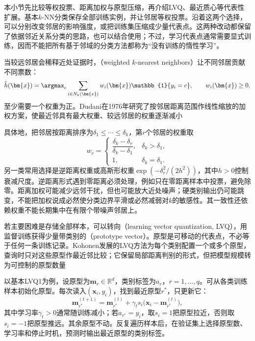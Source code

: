 本小节先比较等权投票、距离加权与原型压缩，再介绍LVQ、最近质心等代表性扩展。基本$k$-NN分类保存全部训练实例，并让邻居等权投票。沿着这两个选择，可以分别改变邻居的影响强度，或把训练集压缩成少量代表点。这两种改动都保留了依据邻近关系分类的思路，也可以结合使用；不过，学习代表点通常需要显式训练，因而不能把所有基于邻域的分类方法都称为“没有训练的惰性学习”。

当较远邻居会稀释近处证据时，（weighted $k$-nearest neighbors）让不同邻居贡献不同票数：
\begin{equation}
  \hat h(\bm{x})=\argmax_c
  \sum_{i\in N_k(\bm{x})}
  w_i(\bm{x})\mathbb{1}\{y_i=c\},
  \qquad w_i(\bm{x})\geq0.
  \label{eq:classification-weighted-knn}
\end{equation}
至少需要一个权重为正。Dudani在1976年研究了按邻居距离范围作线性缩放的加权方案，使最近邻具有最大权重、较远邻居的权重逐渐减小

具体地，把邻居按距离排序为$\delta_1\leq\cdots\leq\delta_k$，第$r$个邻居的权重取
\begin{equation}
  w_r=
  \begin{cases}
    \dfrac{\delta_k-\delta_r}{\delta_k-\delta_1},
      & \delta_k>\delta_1,\\[4pt]
    1, & \delta_k=\delta_1.
  \end{cases}
  \label{eq:classification-dudani-weights}
\end{equation}
另一类常用选择是逆距离权重或高斯形权重$\exp(-\delta_r^2/(2h^2))$，其中$h>0$控制衰减尺度。逆距离形式遇到零距离必须处理，例如只在零距离样本中投票，避免除零。距离加权可能减少远邻干扰，但也可能放大近处噪声；硬类别输出仍可能跳变，不能把加权说成必然使分类边界平滑或必然减弱对$k$的敏感性。其一致性还依赖权重不能长期集中在有限个带噪声邻居上。

若主要困难是存储全部样本，可以转向（learning vector quantization, LVQ），用监督训练获得少量带类别的（prototype vector）。原型是可移动的代表点，不必等于任何一条训练记录。Kohonen发展的LVQ方法为每个类别配置一个或多个原型，查询时只对这些原型作最近邻比较；它保留局部距离判别的形式，但把模型规模转为可控制的原型数量

以基本LVQ1为例，设原型为$\bm{m}_r\in\mathbb{R}^d$，类别标签为$a_r$，$r=1,\ldots,q$。可从各类训练样本初始化原型。每次读入$(\bm{x}_i,y_i)$，找到最近原型$r^\ast$，只更新它：
\begin{equation}
  \bm{m}_{r^\ast}^{(t+1)}
  =\bm{m}_{r^\ast}^{(t)}
   +\gamma_t s_i
    \bigl(\bm{x}_i-\bm{m}_{r^\ast}^{(t)}\bigr),
  \label{eq:classification-lvq-update}
\end{equation}
其中学习率$\gamma_t>0$通常随训练减小；若$a_{r^\ast}=y_i$，取$s_i=1$把原型拉近，否则取$s_i=-1$把原型推远。其余原型不动。反复遍历样本后，在验证集上选择原型数、学习率和停止时机，预测时输出最近原型的类别标签。

